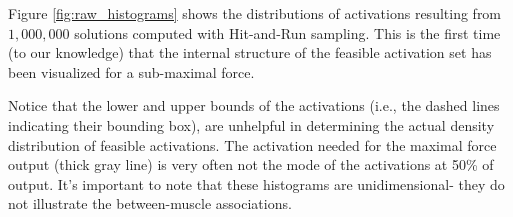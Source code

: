 Figure \ref{fig:raw_histograms} shows the distributions of activations resulting from $1,000,000$ solutions computed with Hit-and-Run sampling. This is the first time (to our knowledge) that the internal structure of the feasible activation set has been visualized for a sub-maximal force.

Notice that the lower and upper bounds of the activations (i.e., the dashed lines indicating their bounding box), are unhelpful in determining the actual density distribution of feasible activations.
The activation needed for the maximal force output (thick gray line) is very often not the mode of the activations at 50\% of output. It's important to note that these histograms are unidimensional- they do not illustrate the between-muscle associations.

